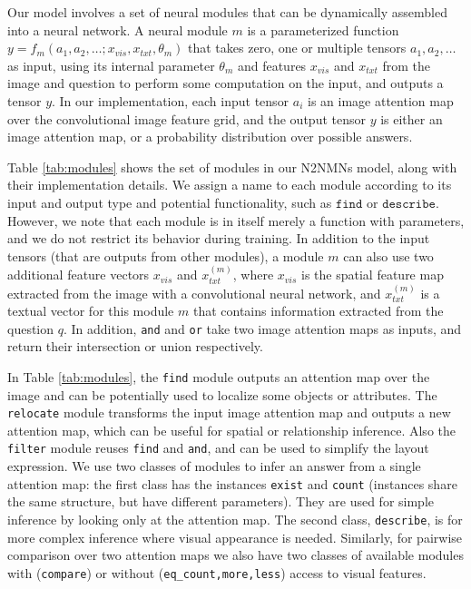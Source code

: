 \documentclass[10pt,twocolumn,letterpaper]{article}
\begin{document}
Our model involves a set of neural modules that can be dynamically assembled into a neural network. A neural module $m$ is a parameterized function $y=f_m(a_1, a_2, \ldots ; x_{vis}, x_{txt}, \theta_m)$ that takes zero, one or multiple tensors $a_1,a_2,\ldots$ as input, using its internal parameter $\theta_m$ and features $x_{vis}$ and $x_{txt}$ from the image and question to perform some computation on the input, and outputs a tensor $y$. In our implementation, each input tensor $a_i$ is an image attention map over the convolutional image feature grid, and the output tensor $y$ is either an image attention map, or a probability distribution over possible answers.

Table \ref{tab:modules} shows the set of modules in our N2NMNs model, along with their implementation details. We assign a name to each module according to its input and output type and potential functionality, such as $\texttt{find}$ or $\texttt{describe}$. However, we note that each module is in itself merely a function with parameters, and we do not restrict its behavior during training. In addition to the input tensors (that are outputs from other modules), a module $m$ can also use two additional feature vectors $x_{vis}$ and $x_{txt}^{(m)}$, where $x_{vis}$ is the spatial feature map extracted from the image with a convolutional neural network, and $x_{txt}^{(m)}$ is a textual vector for this module $m$ that contains information extracted from the question $q$. In addition, \texttt{and} and \texttt{or} take two image attention maps as inputs, and return their intersection or union respectively.

In Table \ref{tab:modules}, the \texttt{find} module outputs an attention map over the image and can be potentially used to localize some objects or attributes. The \texttt{relocate} module transforms the input image attention map and outputs a new attention map, which can be useful for spatial or relationship inference. Also the \texttt{filter} module reuses \texttt{find} and \texttt{and}, and can be used to simplify the layout expression. We use two classes of modules to infer an answer from a single attention map: the first class has the instances \texttt{exist} and \texttt{count} (instances share the same structure, but have different parameters). They are used for simple inference by looking only at the attention map. The second class, \texttt{describe}, is for more complex inference where visual appearance is needed. Similarly, for pairwise comparison over two attention maps we also have two classes of available modules with (\texttt{compare}) or without (\texttt{eq\_count,more,less}) access to visual features.
\end{document}
